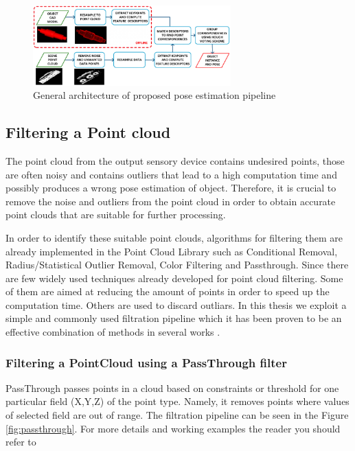 \begin{figure}[!h]
\begin{center}
\includegraphics[width=3in]{figures03/pipeline.png}
\caption{General architecture of proposed pose estimation pipeline}%
\label{fig:pipeline}
\end{center}
\end{figure}




\subsection{Filtering a Point cloud}
The point cloud from the output sensory device contains undesired points, those are often noisy and contains outliers that lead to a high computation time and possibly produces a wrong pose estimation of object. Therefore, it is crucial to remove the noise and outliers from the point cloud in order to obtain accurate point clouds that are suitable for further processing. 

In order to identify these suitable point clouds, algorithms for filtering them are already implemented in the Point Cloud Library such as Conditional Removal, Radius/Statistical Outlier Removal, Color Filtering and Passthrough. 
Since there are few widely used techniques already developed for point cloud filtering. Some of them are aimed at reducing the amount of points in order to speed up the computation time. Others are used to discard outliars. In this thesis we exploit a simple and commonly used filtration pipeline which it has been proven to be an effective combination of methods in several works \cite{algFiltering}.

\subsubsection{Filtering a PointCloud using a PassThrough filter}
PassThrough passes points in a cloud based on constraints or threshold for one particular field (X,Y,Z) of the point type. Namely, it removes points where values of selected field are out of range. The filtration pipeline can be seen in the Figure \ref{fig:passthrough}. For more details and working examples the reader you should refer to \cite{pcl}

